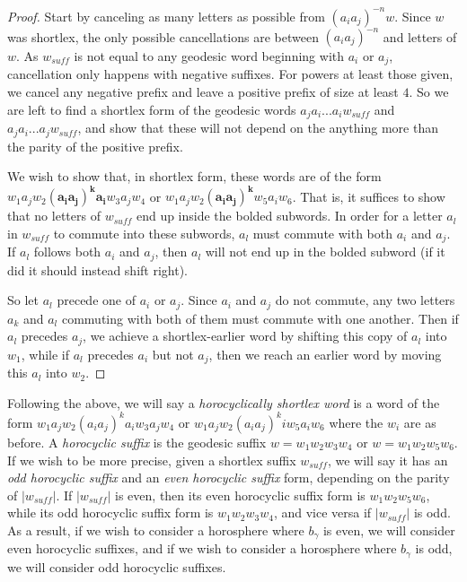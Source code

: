 \documentclass{amsart}
\theoremstyle{definition}
\theoremstyle{remark}
\begin{document}
	\begin{proof}
		Start by canceling as many letters as possible from $(a_ia_j)^{-n}w$. Since $w$ was shortlex, the only possible cancellations are between $(a_ia_j)^{-n}$ and letters of $w$. As $w_{suff}$ is not equal to any geodesic word beginning with $a_i$ or $a_j$, cancellation only happens with negative suffixes. For powers at least those given, we cancel any negative prefix and leave a positive prefix of size at least $4$. So we are left to find a shortlex form of the geodesic words $a_ja_i...a_iw_{suff}$ and $a_ja_i...a_j w_{suff}$, and show that these will not depend on the anything more than the parity of the positive prefix.
		
		We wish to show that, in shortlex form, these words are of the form $w_1a_jw_2\mathbf{(a_ia_j)^ka_i}w_3a_jw_4$ or $w_1a_jw_2\mathbf{(a_ia_j)^k}w_5a_iw_6$. That is, it suffices to show that no letters of $w_{suff}$ end up inside the bolded subwords. In order for a letter $a_l$ in $w_{suff}$ to commute into these subwords, $a_l$ must commute with both $a_i$ and $a_j$. If $a_l$ follows both $a_i$ and $a_j$, then $a_l$ will not end up in the bolded subword (if it did it should instead shift right). 
		
		So let $a_l$ precede one of $a_i$ or $a_j$. Since $a_i$ and $a_j$ do not commute, any two letters $a_k$ and $a_l$ commuting with both of them must commute with one another. Then if $a_l$ precedes $a_j$, we achieve a shortlex-earlier word by shifting this copy of $a_l$ into $w_1$, while if $a_l$ precedes $a_i$ but not $a_j$, then we reach an earlier word by moving this $a_l$ into $w_2$. 		
	\end{proof}
	
	Following the above, we will say a \textit{horocyclically shortlex word} is a word of the form $w_1a_jw_2(a_ia_j)^ka_iw_3a_jw_4$ or $w_1a_jw_2(a_ia_j)^kiw_5a_iw_6$ where the $w_i$ are as before.  A \textit{horocyclic suffix} is the geodesic suffix $w=w_1w_2w_3w_4$ or $w=w_1w_2w_5w_6$. If we wish to be more precise, given a shortlex suffix $w_{suff}$, we will say it has an \textit{odd horocyclic suffix} and an \textit{even horocyclic suffix} form, depending on the parity of $|w_{suff}|$. If $|w_{suff}|$ is even, then its even horocyclic suffix form is $w_1w_2w_5w_6$, while its odd horocyclic suffix form is $w_1w_2w_3w_4$, and vice versa if $|w_{suff}|$ is odd. As a result, if we wish to consider a horosphere where $b_{\gamma}$ is even, we will consider even horocyclic suffixes, and if we wish to consider a horosphere where $b_{\gamma}$ is odd, we will consider odd horocyclic suffixes.
	
\end{document}
